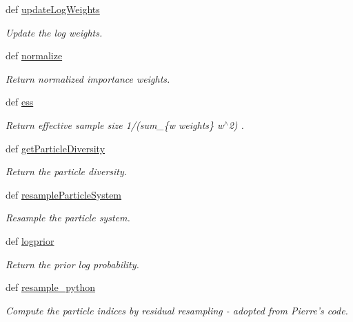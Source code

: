 \begin{CompactItemize}
def \hyperlink{classsmc_1_1smc_698a2598642ff7f48f0b6ab87b0e81cc}{updateLogWeights}
\begin{CompactList}\small\item\em Update the log weights. \item\end{CompactList}\item 
def \hyperlink{classsmc_1_1smc_495a950f5dc0aa66fdf5279ae8ca6242}{normalize}
\begin{CompactList}\small\item\em Return normalized importance weights. \item\end{CompactList}\item 
def \hyperlink{classsmc_1_1smc_95aec6accabbea27d33eb8a5a4eb7ed2}{ess}
\begin{CompactList}\small\item\em Return effective sample size 1/(sum\_\-\{w  weights\} w$^\wedge$2) . \item\end{CompactList}\item 
def \hyperlink{classsmc_1_1smc_61bd1b39ab3f3dcbfe19cca533276937}{getParticleDiversity}
\begin{CompactList}\small\item\em Return the particle diversity. \item\end{CompactList}\item 
def \hyperlink{classsmc_1_1smc_7c417c930e9039fd1bbda56d40ceb38d}{resampleParticleSystem}
\begin{CompactList}\small\item\em Resample the particle system. \item\end{CompactList}\item 
def \hyperlink{classsmc_1_1smc_50453b83eb4dc3519a2be7cba5ae51c7}{logprior}
\begin{CompactList}\small\item\em Return the prior log probability. \item\end{CompactList}\item 
def \hyperlink{classsmc_1_1smc_7af51336a53e7096b370af78e42e9cfa}{resample\_\-python}
\begin{CompactList}\small\item\em Compute the particle indices by residual resampling - adopted from Pierre's code. \item\end{CompactList}\item 

\end{CompactItemize}
